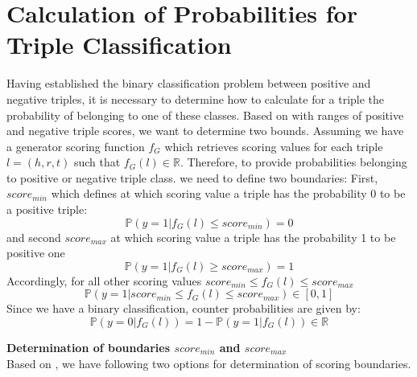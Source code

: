 \section{Calculation of Probabilities for Triple Classification}
\label{sec:calculation_of_probabilities_for_triple_classification}
Having established the binary classification problem between positive and negative triples, it is necessary to determine how to calculate for a triple the probability of belonging to one of these classes.
Based on  with ranges of positive and negative triple scores, we want to determine two bounds.
Assuming we have a generator scoring function $f_G$ which retrieves scoring values for each triple $l = (h,r,t)$ such that $f_G(l) \in \mathbb{R}$.
Therefore, to provide probabilities belonging to positive or negative triple class. we need to define two boundaries:
First, $score_{min}$ which defines at which scoring value a triple has the probability 0 to be a positive triple: 
\begin{equation} \label{eqn:prob_score_min}
    \mathds{P}(y = 1 | f_G(l) \leq score_{min}) = 0
\end{equation}
and second $score_{max}$ at which scoring value a triple has the probability 1 to be positive one 
\begin{equation} \label{eqn:prob_score_max}
    \mathds{P}(y = 1 | f_G(l) \geq score_{max}) = 1
\end{equation}
Accordingly, for all other scoring values $score_{min} \leq f_G(l) \leq score_{max}$
\begin{equation} \label{eqn:prob_score_all}
    \mathds{P}(y = 1 | score_{min} \leq f_G(l) \leq score_{max}) \in [0, 1]
\end{equation}
Since we have a binary classification, counter probabilities are given by:
\begin{equation} \label{eqn:counter_prob}
    \mathds{P}(y = 0 | f_G(l)) = 1 - \mathds{P}(y = 1 | f_G(l)) \in \mathbb{R}
\end{equation}

\textbf{Determination of boundaries $score_{min}$ and $score_{max}$}\\
Based on , we have following two options for determination of scoring boundaries.

